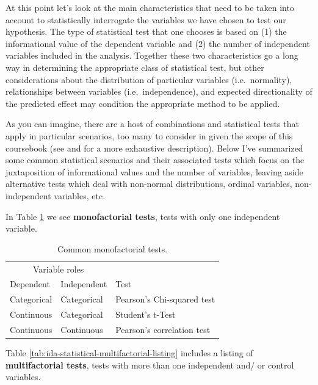 \documentclass[
]{article}
\begin{document}
At this point let's look at the main characteristics that need to be taken into account to statistically interrogate the variables we have chosen to test our hypothesis. The type of statistical test that one chooses is based on (1) the informational value of the dependent variable and (2) the number of independent variables included in the analysis. Together these two characteristics go a long way in determining the appropriate class of statistical test, but other considerations about the distribution of particular variables (i.e.~normality), relationships between variables (i.e.~independence), and expected directionality of the predicted effect may condition the appropriate method to be applied.

As you can imagine, there are a host of combinations and statistical tests that apply in particular scenarios, too many to consider in given the scope of this coursebook (see \citet{Gries2013a} and \citet{Paquot2020a} for a more exhaustive description). Below I've summarized some common statistical scenarios and their associated tests which focus on the juxtaposition of informational values and the number of variables, leaving aside alternative tests which deal with non-normal distributions, ordinal variables, non-independent variables, etc.

In Table \ref{tab:ida-statistical-monofactorial-listing} we see \textbf{monofactorial tests}, tests with only one independent variable.

\begin{table}

\caption{\label{tab:ida-statistical-monofactorial-listing}Common monofactorial tests.}
\centering
\begin{tabular}[t]{lll}
\toprule
\multicolumn{2}{c}{Variable roles} & \multicolumn{1}{c}{ } \\
\cmidrule(l{3pt}r{3pt}){1-2}
Dependent & Independent & Test\\
\midrule
Categorical & Categorical & Pearson's Chi-squared test\\
Continuous & Categorical & Student's t-Test\\
Continuous & Continuous & Pearson's correlation test\\
\bottomrule
\end{tabular}
\end{table}

Table \ref{tab:ida-statistical-multifactorial-listing} includes a listing of \textbf{multifactorial tests}, tests with more than one independent and/ or control variables.
\end{document}
